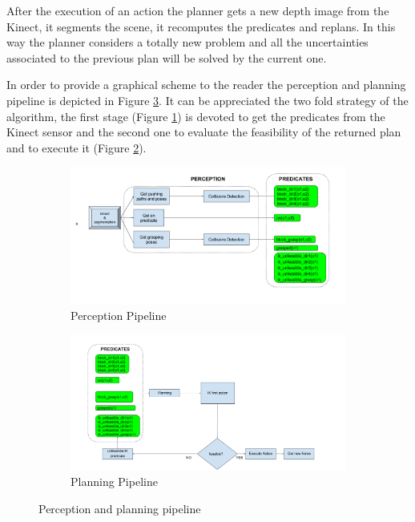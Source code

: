After the execution of an action the planner gets a new depth image from the Kinect, it segments the scene, it recomputes the predicates and replans. In this way the planner considers a totally new problem and all the uncertainties associated to the previous plan will be solved by the current one. 

In order to provide a graphical scheme to the reader the perception and planning pipeline is depicted in Figure \ref{fig:pipeline}. It can be appreciated the two fold strategy of the algorithm, the first stage (Figure \ref{fig:pipeline1}) is devoted to get the predicates from the Kinect sensor and the second one to evaluate the feasibility of the returned plan and to execute it (Figure \ref{fig:pipeline2}).

\begin{figure}[tb]

\centering
\begin{subfigure}[t]{\textwidth}
\centering
\includegraphics[width=\textwidth]{Img/planning/Pipeline1.png}
\caption{Perception Pipeline}\label{fig:pipeline1}
\end{subfigure}
\begin{subfigure}[t]{\textwidth}
\centering
\includegraphics[width=\textwidth]{Img/planning/Pipeline2.png}
\caption{Planning Pipeline}\label{fig:pipeline2}
\end{subfigure}
\caption{Perception and planning pipeline}\label{fig:pipeline}
\end{figure}

